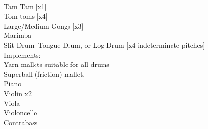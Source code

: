 \documentclass[11pt]{article}
\begin{document}
\\
\hspace*{3cm} Tam Tam [x1]
\\
\hspace*{3cm} Tom-toms [x4]
\\
\hspace*{3cm} Large/Medium Gongs [x3]
\\
\hspace*{3cm} Marimba
\\
\hspace*{3cm} Slit Drum, Tongue Drum, or Log Drum [x4 indeterminate pitches]
\\
\hspace*{2cm} Implements:
\\
\hspace*{3cm} Yarn mallets suitable for all drums
\\
\hspace*{3cm} Superball (friction) mallet.
\\
\hspace*{1cm} Piano
\\
\hspace*{1cm} Violin x2
\\
\hspace*{1cm} Viola
\\
\hspace*{1cm} Violoncello
\\
\hspace*{1cm} Contrabass

\vspace*{1.25\baselineskip}
\end{document}
